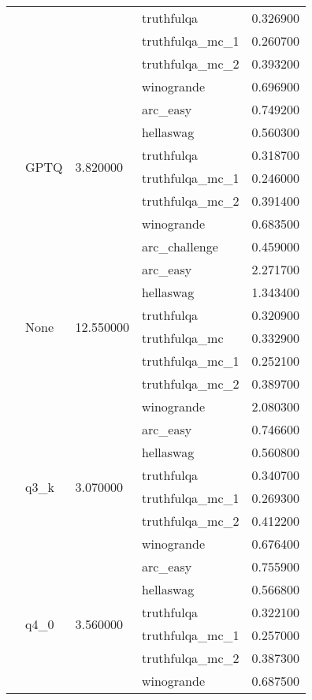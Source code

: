 \begin{tabular}{lllll}
 &  &  & truthfulqa & 0.326900 \\
 &  &  & truthfulqa\_mc\_1 & 0.260700 \\
 &  &  & truthfulqa\_mc\_2 & 0.393200 \\
 &  &  & winogrande & 0.696900 \\
\cline{2-5} \cline{3-5}
 & \multirow[t]{6}{*}{GPTQ} & \multirow[t]{6}{*}{3.820000} & arc\_easy & 0.749200 \\
 &  &  & hellaswag & 0.560300 \\
 &  &  & truthfulqa & 0.318700 \\
 &  &  & truthfulqa\_mc\_1 & 0.246000 \\
 &  &  & truthfulqa\_mc\_2 & 0.391400 \\
 &  &  & winogrande & 0.683500 \\
\cline{2-5} \cline{3-5}
 & \multirow[t]{8}{*}{None} & \multirow[t]{8}{*}{12.550000} & arc\_challenge & 0.459000 \\
 &  &  & arc\_easy & 2.271700 \\
 &  &  & hellaswag & 1.343400 \\
 &  &  & truthfulqa & 0.320900 \\
 &  &  & truthfulqa\_mc & 0.332900 \\
 &  &  & truthfulqa\_mc\_1 & 0.252100 \\
 &  &  & truthfulqa\_mc\_2 & 0.389700 \\
 &  &  & winogrande & 2.080300 \\
\cline{2-5} \cline{3-5}
 & \multirow[t]{6}{*}{q3\_k} & \multirow[t]{6}{*}{3.070000} & arc\_easy & 0.746600 \\
 &  &  & hellaswag & 0.560800 \\
 &  &  & truthfulqa & 0.340700 \\
 &  &  & truthfulqa\_mc\_1 & 0.269300 \\
 &  &  & truthfulqa\_mc\_2 & 0.412200 \\
 &  &  & winogrande & 0.676400 \\
\cline{2-5} \cline{3-5}
 & \multirow[t]{6}{*}{q4\_0} & \multirow[t]{6}{*}{3.560000} & arc\_easy & 0.755900 \\
 &  &  & hellaswag & 0.566800 \\
 &  &  & truthfulqa & 0.322100 \\
 &  &  & truthfulqa\_mc\_1 & 0.257000 \\
 &  &  & truthfulqa\_mc\_2 & 0.387300 \\
 &  &  & winogrande & 0.687500 \\
\cline{2-5} \cline{3-5}

\end{tabular}
